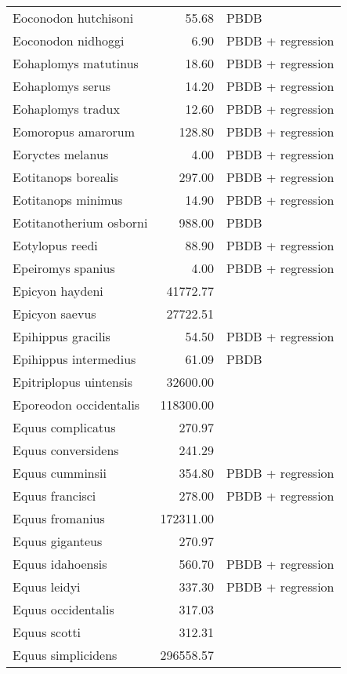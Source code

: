 \begin{table}[ht]
\begin{tabular}{lrl}
  Eoconodon hutchisoni & 55.68 & PBDB \\ 
  Eoconodon nidhoggi & 6.90 & PBDB + regression \\ 
  Eohaplomys matutinus & 18.60 & PBDB + regression \\ 
  Eohaplomys serus & 14.20 & PBDB + regression \\ 
  Eohaplomys tradux & 12.60 & PBDB + regression \\ 
  Eomoropus amarorum & 128.80 & PBDB + regression \\ 
  Eoryctes melanus & 4.00 & PBDB + regression \\ 
  Eotitanops borealis & 297.00 & PBDB + regression \\ 
  Eotitanops minimus & 14.90 & PBDB + regression \\ 
  Eotitanotherium osborni & 988.00 & PBDB \\ 
  Eotylopus reedi & 88.90 & PBDB + regression \\ 
  Epeiromys spanius & 4.00 & PBDB + regression \\ 
  Epicyon haydeni & 41772.77 & \cite{Tomiya2013} \\ 
  Epicyon saevus & 27722.51 & \cite{Tomiya2013} \\ 
  Epihippus gracilis & 54.50 & PBDB + regression \\ 
  Epihippus intermedius & 61.09 & PBDB \\ 
  Epitriplopus uintensis & 32600.00 & \cite{MacFadden1986} \\ 
  Eporeodon occidentalis & 118300.00 & \cite{McKenna2011} \\ 
  Equus complicatus & 270.97 & \cite{Smith2004} \\ 
  Equus conversidens & 241.29 & \cite{Smith2004} \\ 
  Equus cumminsii & 354.80 & PBDB + regression \\ 
  Equus francisci & 278.00 & PBDB + regression \\ 
  Equus fromanius & 172311.00 & \cite{McKenna2011} \\ 
  Equus giganteus & 270.97 & \cite{Smith2004} \\ 
  Equus idahoensis & 560.70 & PBDB + regression \\ 
  Equus leidyi & 337.30 & PBDB + regression \\ 
  Equus occidentalis & 317.03 & \cite{Smith2004} \\ 
  Equus scotti & 312.31 & \cite{Smith2004} \\ 
  Equus simplicidens & 296558.57 & \cite{Tomiya2013} \\ 

\end{tabular}
\end{table}
